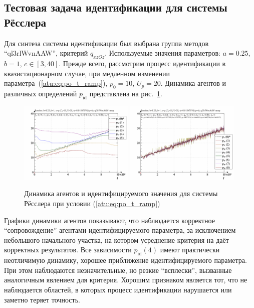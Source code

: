 
\subsection{Тестовая задача идентификации для системы Рёсслера}  %

Для синтеза системы идентификации был выбрана группа методов ``ql3rlWvnAAW'',
критерий $q_{xzOz}$.
Используемые значения параметров: $a=0.25$, $b=1$, $ c \in [3, 40 ]$.
Прежде всего, рассмотрим процесс идентификации
в квазистационарном случае,
при медленном изменении параметра~(\ref{atu:eq:po_t_ramp}), $p_0=10$, $U_p=20$.
Динамика агентов и различных определений $p_\mathrm{id}$
представлена на рис.~\ref{atu:f:ross_id_ramp}.


\begin{figure}[ht!]
\begin{center}
  \includegraphics[width=0.49\textwidth]{p/cha/ross/ross_id-p_t_pi_ql3rlWvnAAW_ramp.png}
  \hfill
  \includegraphics[width=0.49\textwidth]{p/cha/ross/ross_id-p_t_p_ql3rlWvnAAW_ramp.png}
\end{center}
  \caption{Динамика агентов и идентифицируемого значения для системы Рёсслера при условии (\ref{atu:eq:po_t_ramp})}
\label{atu:f:ross_id_ramp}
\end{figure}

Графики динамики агентов показывают, что наблюдается корректное
``сопровождение'' агентами идентифицируемого параметра, за исключением
небольшого начального участка, на котором усреднение критерия
на даёт корректных результатов. Все зависимости $p_\mathrm{id}(4)$
имеют практически неотличимую динамику, хорошее приближение идентифицируемого параметра.
При этом наблюдаются незначительные, но резкие ``всплески'',
вызванные аналогичным явлением для критерия.
Хорошим признаком является тот, что не наблюдается областей,
в которых процесс идентификации нарушается или заметно теряет точность.

